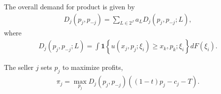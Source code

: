 The overall demand for product is given by
\begin{equation}
    \begin{aligned}
        D_j(p_j,p_{-j})=\sum_{L\in 2^J}a_L D_j(p_j,p_{-j};L),
    \end{aligned}
    \nonumber
\end{equation}
where
\begin{equation}
    \begin{aligned}
        D_j(p_j,p_{-j};L)=\int \mathbf{1}\left\{u(x_j,p_j;\xi_i)\geq x_k,p_k;\xi_i\right\}d F(\xi_i).
    \end{aligned}
    \nonumber
\end{equation}

The seller $j$ sets $p_j$ to maximize profits,
\begin{equation}
    \begin{aligned}
        \pi_j=\max_{p_j}D_j(p_j,p_{-j})\left((1-t)p_j-c_j-T\right).
    \end{aligned}
    \nonumber
\end{equation}